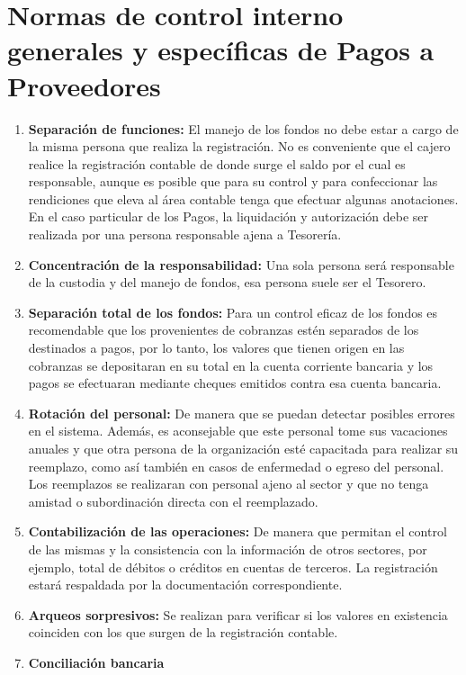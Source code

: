 \section{Normas de control interno generales y específicas de Pagos a Proveedores}
\begin{enumerate}
  \item \textbf{Separación de funciones:}
El manejo de los fondos no debe estar a cargo de la misma persona que realiza la registración.  No es conveniente que el cajero realice la registración contable de donde surge el saldo por el cual es responsable, aunque es posible que para su control y para confeccionar las rendiciones que eleva al área contable tenga que efectuar algunas anotaciones.   En el caso particular de los Pagos, la liquidación y autorización debe ser realizada por una persona responsable ajena a Tesorería.
  \item \textbf{Concentración de la responsabilidad:}
Una sola persona será responsable de la custodia y del manejo de fondos, esa persona suele ser el Tesorero.
  \item \textbf{Separación total de los fondos:}
Para un control eficaz de los fondos es recomendable que los provenientes de cobranzas estén separados de los destinados a pagos,  por lo tanto, los valores que tienen origen en las cobranzas se depositaran en su total en la cuenta corriente bancaria y los pagos se efectuaran mediante cheques emitidos contra esa cuenta bancaria.
  \item \textbf{Rotación del personal:}
De manera que se puedan detectar posibles errores en el sistema.  Además, es aconsejable que este personal tome sus vacaciones anuales y que otra persona de la organización esté capacitada para realizar su reemplazo, como así también en casos de enfermedad o egreso del personal.  Los reemplazos se realizaran con personal ajeno al sector y que no tenga amistad o subordinación directa con el reemplazado.
  \item \textbf{Contabilización de las operaciones:}
De manera que permitan el control de las mismas y la consistencia con la información de otros sectores, por ejemplo, total de débitos o créditos en cuentas de terceros.  La registración estará respaldada por la documentación correspondiente.
  \item \textbf{Arqueos sorpresivos:}
Se realizan para verificar si los valores en existencia coinciden con los que surgen de la registración contable.
  \item \textbf{Conciliación bancaria}
\end{enumerate}

